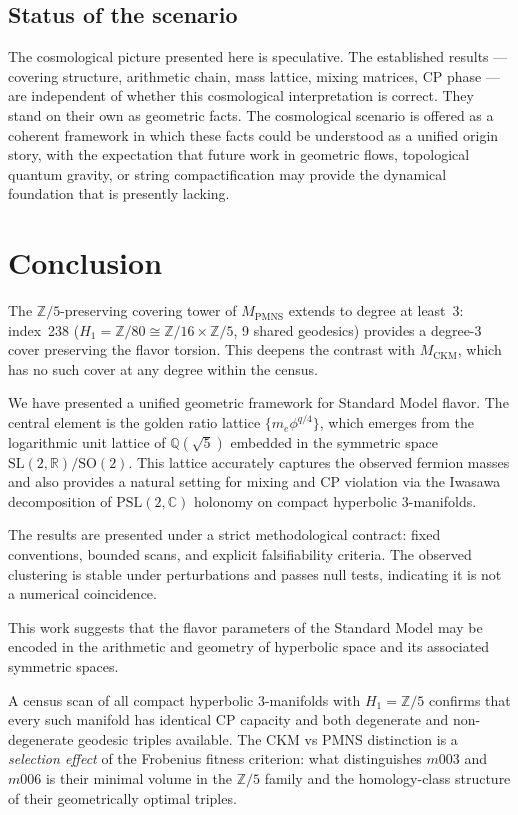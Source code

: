 ﻿\documentclass[12pt]{article}
\theoremstyle{definition}
\begin{document}
\subsection{Status of the scenario}

The cosmological picture presented here is speculative. The
established results --- covering structure, arithmetic chain, mass
lattice, mixing matrices, CP phase --- are independent of whether
this cosmological interpretation is correct. They stand on their own
as geometric facts. The cosmological scenario is offered as a
coherent framework in which these facts could be understood as a
unified origin story, with the expectation that future work in
geometric flows, topological quantum gravity, or string
compactification may provide the dynamical foundation that is
presently lacking.

\section{Conclusion}
\label{sec:conclusion}

The $\mathbb{Z}/5$-preserving covering tower of $M_\text{PMNS}$ extends to degree at least~3: index~238 ($H_1=\mathbb{Z}/80\cong\mathbb{Z}/16\times\mathbb{Z}/5$, 9 shared geodesics) provides a degree-3 cover preserving the flavor torsion. This deepens the contrast with $M_\text{CKM}$, which has no such cover at any degree within the census.

We have presented a unified geometric framework for Standard Model flavor. The central element is the golden ratio lattice $\{m_e \phi^{q/4}\}$, which emerges from the logarithmic unit lattice of $\mathbb{Q}(\sqrt5)$ embedded in the symmetric space $\mathrm{SL}(2,\mathbb{R})/\mathrm{SO}(2)$. This lattice accurately captures the observed fermion masses and also provides a natural setting for mixing and CP violation via the Iwasawa decomposition of $\mathrm{PSL}(2,\mathbb{C})$ holonomy on compact hyperbolic 3-manifolds.

The results are presented under a strict methodological contract: fixed conventions, bounded scans, and explicit falsifiability criteria. The observed clustering is stable under perturbations and passes null tests, indicating it is not a numerical coincidence.

This work suggests that the flavor parameters of the Standard Model may be encoded in the arithmetic and geometry of hyperbolic space and its associated symmetric spaces.

A census scan of all compact hyperbolic 3-manifolds with $H_1=\mathbb{Z}/5$ confirms that every such manifold has identical CP capacity and both degenerate and non-degenerate geodesic triples available. The CKM vs PMNS distinction is a \emph{selection effect} of the Frobenius fitness criterion: what distinguishes $m003$ and $m006$ is their minimal volume in the $\mathbb{Z}/5$ family and the homology-class structure of their geometrically optimal triples.
\end{document}
